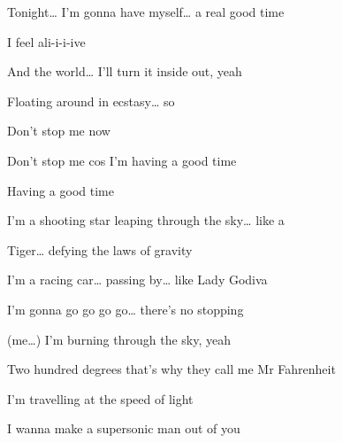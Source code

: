 \begin{song}


\begin{vchordbox}
\par
{}\par
{}\par
{}\par
{}\par
{}\par
{}\par
\end{vchordbox}

\large

\bigskip

Tonight… I’m gonna have myself… a real good time \par
I feel ali-i-i-ive \par
And the world… I’ll turn it inside out, yeah \par
{}Floating around in ecstasy… so \par
{}Don’t stop me now \par
{}Don’t stop me cos I’m having a good time \par
{}Having a good time \par

\bigskip

I’m a shooting star leaping through the sky… like a \par
Tiger… defying the laws of gravity \par
I’m a racing car… passing by… like Lady Godiva \par
I’m gonna go go go go… there’s no stopping \par

\bigskip

\begin{chorusbox}{\PrechorusAndChorus}
(me…) I’m burning through the sky, yeah \par
Two hundred degrees that’s why they call me Mr Fahrenheit \par
I’m travelling at the speed of light \par
I wanna make a supersonic man out of you


\end{chorusbox}
\end{song}
